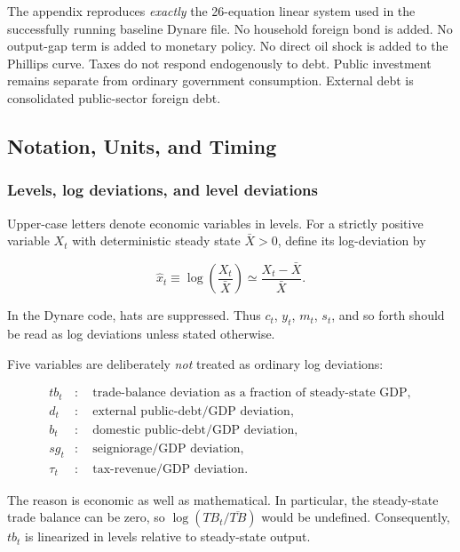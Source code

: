 The appendix reproduces \emph{exactly} the 26-equation linear system used in the
successfully running baseline Dynare file. No household foreign bond is added.
No output-gap term is added to monetary policy. No direct oil shock is added to
the Phillips curve. Taxes do not respond endogenously to debt. Public
investment remains separate from ordinary government consumption. External
debt is consolidated public-sector foreign debt.

\subsection{Notation, Units, and Timing}
\label{app:notation}

\subsubsection{Levels, log deviations, and level deviations}

Upper-case letters denote economic variables in levels. For a strictly positive
variable \(X_t\) with deterministic steady state \(\bar X>0\), define its
log-deviation by

\begin{equation}
\widehat{x}_t
\equiv
\log\left(\frac{X_t}{\bar X}\right)
\simeq
\frac{X_t-\bar X}{\bar X}.
\label{eq:hatdefinition}
\end{equation}

In the Dynare code, hats are suppressed. Thus \(c_t\), \(y_t\), \(m_t\),
\(s_t\), and so forth should be read as log deviations unless stated
otherwise.

Five variables are deliberately \emph{not} treated as ordinary log deviations:

\begin{align}
tb_t &:\quad \text{trade-balance deviation as a fraction of steady-state GDP},\\
d_t  &:\quad \text{external public-debt/GDP deviation},\\
b_t  &:\quad \text{domestic public-debt/GDP deviation},\\
sg_t &:\quad \text{seigniorage/GDP deviation},\\
\tau_t &:\quad \text{tax-revenue/GDP deviation}.
\end{align}

The reason is economic as well as mathematical. In particular, the steady-state
trade balance can be zero, so \(\log(TB_t/\overline{TB})\) would be undefined.
Consequently, \(tb_t\) is linearized in levels relative to steady-state output.

